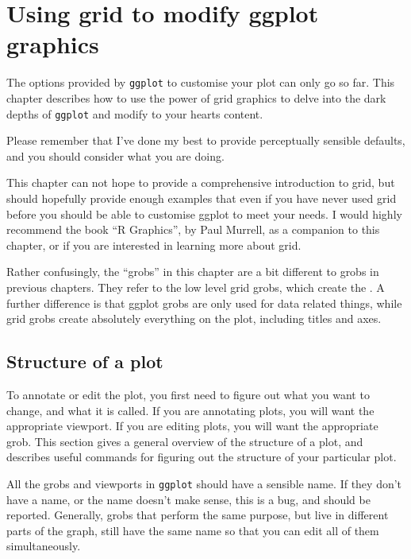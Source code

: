 


\chapter{Using grid to modify ggplot graphics}

The options provided by {\tt ggplot} to customise your plot can only go so far.  This chapter describes how to use the power of grid graphics to delve into the dark depths of {\tt ggplot} and modify to your hearts content.  

Please remember that I've done my best to provide perceptually sensible defaults, and you should consider what you are doing.

This chapter can not hope to provide a comprehensive introduction to grid, but should hopefully provide enough examples that even if you have never used grid before you should be able to customise ggplot to meet your needs.  I would highly recommend the book ``R Graphics'', by Paul Murrell, as a companion to this chapter, or if you are interested in learning more about grid.   

Rather confusingly, the ``grobs'' in this chapter are a bit different to grobs in previous chapters.  They refer to the low level grid grobs, which create the   .  A further difference is that ggplot grobs are only used for data related things, while grid grobs create absolutely everything on the plot, including titles and axes.

\section{Structure of a plot}\label{sec:structure_of_a_plot}

To annotate or edit the plot, you first need to figure out what you want to change, and what it is called.  If you are annotating plots, you will want the appropriate viewport.  If you are editing plots, you will want the appropriate grob.  This section gives a general overview of the structure of a plot, and describes useful commands for figuring out the structure of your particular plot.

All the grobs and viewports in {\tt ggplot} should have a sensible name.  If they don't have a name, or the name doesn't make sense, this is a bug, and should be reported.  Generally, grobs that perform the same purpose, but live in different parts of the graph, still have the same name so that you can edit all of them simultaneously.  

